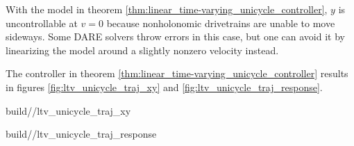 With the \gls{model} in theorem
\ref{thm:linear_time-varying_unicycle_controller}, $y$ is uncontrollable at
$v = 0$ because nonholonomic drivetrains are unable to move sideways. Some DARE
solvers throw errors in this case, but one can avoid it by linearizing the model
around a slightly nonzero velocity instead.

The controller in theorem \ref{thm:linear_time-varying_unicycle_controller}
results in figures \ref{fig:ltv_unicycle_traj_xy} and
\ref{fig:ltv_unicycle_traj_response}.
\begin{bookfigure}
  \begin{minisvg}{2}{build/\chapterpath/ltv_unicycle_traj_xy}
    \caption{Linear time-varying unicycle controller x-y plot}
    \label{fig:ltv_unicycle_traj_xy}
  \end{minisvg}
  \hfill
  \begin{minisvg}{2}{build/\chapterpath/ltv_unicycle_traj_response}
    \caption{Linear time-varying unicycle controller response}
    \label{fig:ltv_unicycle_traj_response}
  \end{minisvg}
\end{bookfigure}
